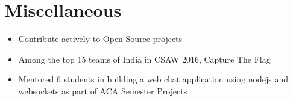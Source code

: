 \section*{\sc Miscellaneous}
\vspace{-2mm}
\hrulefill
\vspace{2mm}

\begin{itemize}
  \item Contribute actively to Open Source projects
  \item Among the top 15 teams of India in CSAW 2016, Capture The Flag
  \item Mentored 6 students in building a web chat application using nodejs and
    websockets as part of ACA Semester Projects
\end{itemize}